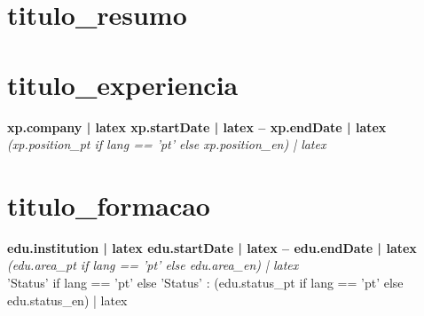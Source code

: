 \documentclass[11pt,a4paper]{article}
\begin{document}
\section*{ {{ titulo_resumo }} }
{%
{%
{%

{%
\section*{ {{ titulo_experiencia }} }
{%
    \noindent \textbf{ {{ xp.company | latex }} } \hfill \textbf{ {{ xp.startDate | latex }} -- {{ xp.endDate | latex }} } \\
    \textit{ {{ (xp.position_pt if lang == 'pt' else xp.position_en) | latex }} }
    \vspace{-1.5mm}
    {%
    {%
    {%
    \vspace{2mm}
{%
{%

{%
\section*{ {{ titulo_formacao }} }
{%
    \noindent \textbf{ {{ edu.institution | latex }} } \hfill \textbf{ {{ edu.startDate | latex }} -- {{ edu.endDate | latex }} } \\
    \textit{ {{ (edu.area_pt if lang == 'pt' else edu.area_en) | latex }} } \\
    {{ 'Status' if lang == 'pt' else 'Status' }}: {{ (edu.status_pt if lang == 'pt' else edu.status_en) | latex }}
    \vspace{2mm}
{%
{%

{%
}}}}}}}}}}}}}}}
\end{document}
